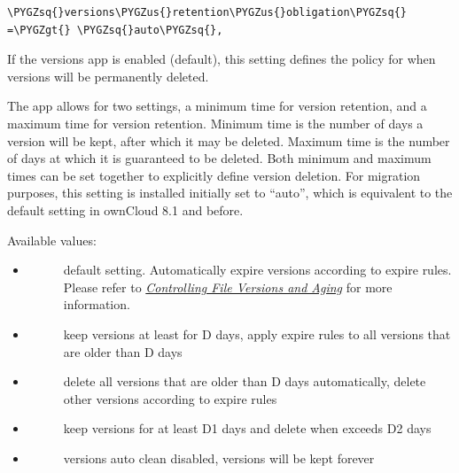 \documentclass[letterpaper,10pt,english]{sphinxmanual}
\def\PYGZus{\char`\_}
\def\PYGZgt{\char`\>}
\def\PYGZsq{\char`\'}
\renewcommand\PYGZsq{\textquotesingle}
\begin{document}
\begin{Verbatim}[commandchars=\\\{\}]
\PYGZsq{}versions\PYGZus{}retention\PYGZus{}obligation\PYGZsq{} =\PYGZgt{} \PYGZsq{}auto\PYGZsq{},
\end{Verbatim}

If the versions app is enabled (default), this setting defines the policy
for when versions will be permanently deleted.

The app allows for two settings, a minimum time for version retention,
and a maximum time for version retention.
Minimum time is the number of days a version will be kept, after which it
may be deleted. Maximum time is the number of days at which it is guaranteed
to be deleted.
Both minimum and maximum times can be set together to explicitly define
version deletion. For migration purposes, this setting is installed
initially set to ``auto'', which is equivalent to the default setting in
ownCloud 8.1 and before.

Available values:
\begin{itemize}
\item {} \begin{description}
\item[{}] \leavevmode
default setting. Automatically expire versions according to expire
rules. Please refer to {\hyperref[configuration_files/file_versioning::doc]{\emph{\emph{Controlling File Versions and Aging}}}} for
more information.

\end{description}

\item {} \begin{description}
\item[{}] \leavevmode
keep versions at least for D days, apply expire rules to all versions
that are older than D days

\end{description}

\item {} \begin{description}
\item[{}] \leavevmode
delete all versions that are older than D days automatically, delete
other versions according to expire rules

\end{description}

\item {} \begin{description}
\item[{}] \leavevmode
keep versions for at least D1 days and delete when exceeds D2 days

\end{description}

\item {} \begin{description}
\item[{}] \leavevmode
versions auto clean disabled, versions will be kept forever

\end{description}

\end{itemize}
\end{document}
